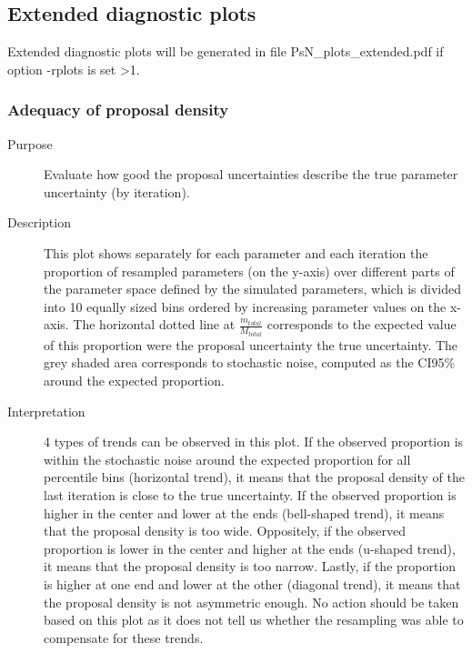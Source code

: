 \subsection{Extended diagnostic plots}
Extended diagnostic plots will be generated
in file PsN\_plots\_extended.pdf if option -rplots is set >1.

\subsubsection{Adequacy of proposal density}
\begin{description}
\item[Purpose] Evaluate how good the proposal uncertainties describe the true parameter uncertainty (by iteration).
\item[Description] This plot shows separately for each parameter and each iteration the proportion of resampled parameters (on the y-axis) over different parts of the parameter space defined by the simulated parameters, which is divided into 10 equally sized bins ordered by increasing parameter values on the x-axis. 
The horizontal dotted line at $\frac{m_{total}}{M_{total}}$ 
corresponds to the expected value of this proportion were the proposal uncertainty the true uncertainty. The grey shaded area corresponds to stochastic noise, computed as the CI95\% 
around the expected proportion.
\item[Interpretation] 4 types of trends can be observed in this plot. If the observed proportion is within the stochastic noise around the expected proportion for all percentile bins (horizontal trend), it means that the proposal density of the last iteration is close to the true uncertainty. If the observed proportion is higher in the center and lower at the ends (bell-shaped trend), it means that the proposal density is too wide. Oppositely, if the observed proportion is lower in the center and higher at the ends (u-shaped trend), it means that the proposal density is too narrow. Lastly, if the proportion is higher at one end and lower at the other (diagonal trend), it means that the proposal density is not asymmetric enough. No action should be taken based on this plot as it does not tell us whether the resampling was able to compensate for these trends.
\end{description}

